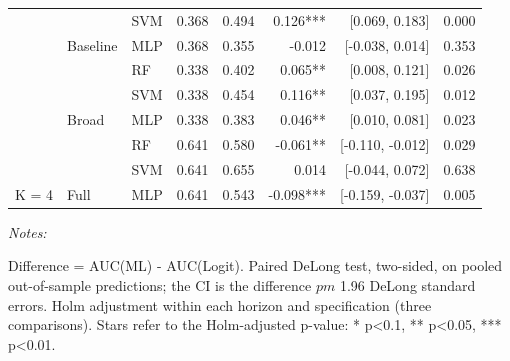 \begin{table}
\begin{threeparttable}
\begin{tabular}[t]{lllrrrrr}
 &  & SVM & 0.368 & 0.494 & 0.126*** & {}[0.069, 0.183] & 0.000\\

 & \multirow[t]{-2}{*}[\normalbaselineskip]{\raggedright\arraybackslash Baseline} & MLP & 0.368 & 0.355 & -0.012 & {}[-0.038, 0.014] & 0.353\\

 &  & RF & 0.338 & 0.402 & 0.065** & {}[0.008, 0.121] & 0.026\\

 &  & SVM & 0.338 & 0.454 & 0.116** & {}[0.037, 0.195] & 0.012\\

 & \multirow[t]{-2}{*}[\normalbaselineskip]{\raggedright\arraybackslash Broad} & MLP & 0.338 & 0.383 & 0.046** & {}[0.010, 0.081] & 0.023\\

 &  & RF & 0.641 & 0.580 & -0.061** & {}[-0.110, -0.012] & 0.029\\

 &  & SVM & 0.641 & 0.655 & 0.014 & {}[-0.044, 0.072] & 0.638\\

\multirow[t]{-8}{*}[\normalbaselineskip]{\raggedright\arraybackslash K = 4} & \multirow[t]{-2}{*}[\normalbaselineskip]{\raggedright\arraybackslash Full} & MLP & 0.641 & 0.543 & -0.098*** & {}[-0.159, -0.037] & 0.005\\
\bottomrule
\end{tabular}
\begin{tablenotes}
\item \textit{Notes: } 
\item Difference = AUC(ML) - AUC(Logit). Paired DeLong test, two-sided, on pooled out-of-sample predictions; the CI is the difference $pm$ 1.96 DeLong standard errors. Holm adjustment within each horizon and specification (three comparisons). Stars refer to the Holm-adjusted p-value: * p<0.1, ** p<0.05, *** p<0.01.
\end{tablenotes}
\end{threeparttable}
\end{table}
